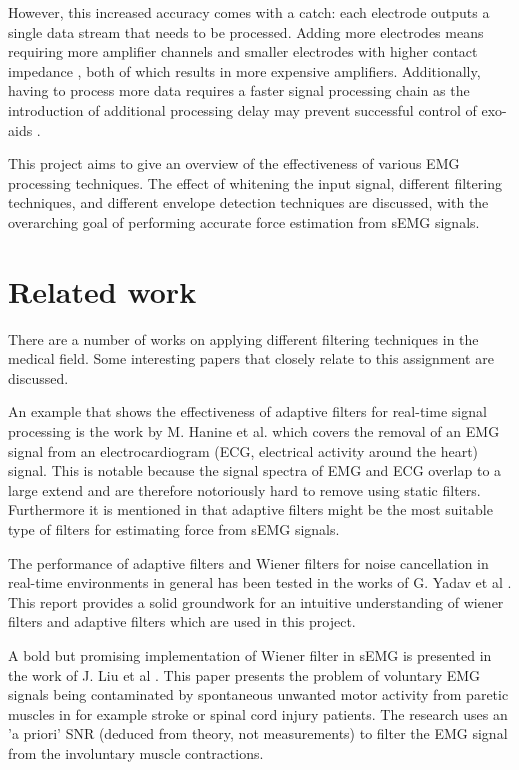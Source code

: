 However, this increased accuracy comes with a catch: each electrode outputs a single data stream that needs to be processed. Adding more electrodes means requiring more amplifier channels and smaller electrodes with higher contact impedance \cite{electrode_size_impedance}, both of which results in more expensive amplifiers. Additionally, having to process more data requires a faster signal processing chain as the introduction of additional processing delay may prevent successful control of exo-aids \cite{processing_delay_control}.

This project aims to give an overview of the effectiveness of various EMG processing techniques. The effect of whitening the input signal, different filtering techniques, and different envelope detection techniques are discussed, with the overarching goal of performing accurate force estimation from sEMG signals.

\section{Related work}
There are a number of works on applying different filtering techniques in the medical field. Some interesting papers that closely relate to this assignment are discussed.

An example that shows the effectiveness of adaptive filters for real-time signal processing is the work by M. Hanine et al. \cite{adaptive_filter_emg_noise_cancellation_ecg} which covers the removal of an EMG signal from an electrocardiogram (ECG, electrical activity around the heart) signal. This is notable because the signal spectra of EMG and ECG overlap to a large extend and are therefore notoriously hard to remove using static filters. Furthermore it is mentioned in \cite{influence_semg_amplitude_estimation_technique_on_emg_force_relationship} that adaptive filters might be the most suitable type of filters for estimating force from sEMG signals.

The performance of adaptive filters and Wiener filters for noise cancellation in real-time environments in general has been tested in the works of G. Yadav et al \cite{wiener_vs_adaptive_realtime_noisecancellation}. This report provides a solid groundwork for an intuitive understanding of wiener filters and adaptive filters which are used in this project.

A bold but promising implementation of Wiener filter in sEMG is presented in the work of J. Liu et al \cite{wiener_filter_a_priori_semg}. This paper presents the problem of voluntary EMG signals being contaminated by spontaneous unwanted motor activity from paretic muscles in for example stroke or spinal cord injury patients. The research uses an 'a priori' SNR (deduced from theory, not measurements) to filter the EMG signal from the involuntary muscle contractions. 

